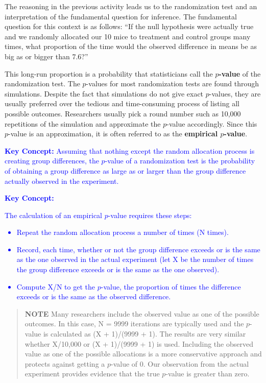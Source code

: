 \documentclass[
]{report}
\begin{document}
The reasoning in the previous activity leads us to the randomization test and an interpretation of the fundamental question for inference. The fundamental question for this context is as follows: ``If the null hypothesis were actually true and we randomly allocated our 10 mice to treatment and control groups many times, what proportion of the time would the observed difference in means be as big as or bigger than 7.6?''

This long-run proportion is a probability that statisticians call the \textbf{\(p\)-value} of the randomization test. The \(p\)-values for most randomization tests are found through simulations. Despite the fact that simulations do not give exact \(p\)-values, they are usually preferred over the tedious and time-consuming process of listing all possible outcomes. Researchers usually pick a round number such as 10,000 repetitions of the simulation and approximate the \(p\)-value accordingly. Since this \(p\)-value is an approximation, it is often referred to as the \textbf{empirical \(p\)-value}.

\textbf{\textcolor{blue}{Key Concept:}}
\textcolor{blue}{Assuming that nothing except the random allocation process is creating group differences, the $p$-value of a randomization test is the probability of obtaining a group difference as large as or larger than the group difference actually observed in the experiment.}

\textbf{\textcolor{blue}{Key Concept:}}

\textcolor{blue}{The calculation of an empirical $p$-value requires these steps:
\begin{itemize}
\item Repeat the random allocation process a number of times (N times).
\item Record, each time, whether or not the group difference exceeds or is the same as the one observed in the actual experiment (let X be the number of times the group difference exceeds or is the same as the one observed).
\item Compute X/N to get the $p$-value, the proportion of times the difference exceeds or is the same as the observed difference.
\end{itemize}}

\begin{quote}
\textbf{NOTE}
Many researchers include the observed value as one of the possible outcomes. In this case, N = 9999 iterations are typically used and the \(p\)-value is calculated as (X + 1)/(9999 + 1). The results are very similar whether X/10,000 or (X + 1)/(9999 + 1) is used. Including the observed value as one of the possible allocations is a more conservative approach and protects against getting a \(p\)-value of 0. Our observation from the actual experiment provides evidence that the true \(p\)-value is greater than zero.
\end{quote}
\end{document}

